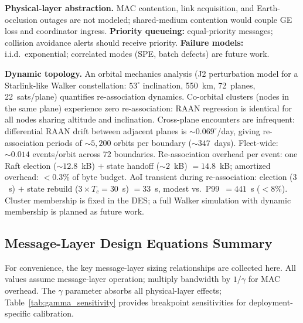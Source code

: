 \documentclass[journal]{IEEEtran}
\begin{document}
\textbf{Physical-layer abstraction.} MAC contention, link acquisition, and Earth-occlusion outages are not modeled; shared-medium contention would couple GE loss and coordinator ingress. \textbf{Priority queueing:} equal-priority messages; collision avoidance alerts should receive priority. \textbf{Failure models:} i.i.d.\ exponential; correlated modes (SPE, batch defects) are future work.

\textbf{Dynamic topology.} An orbital mechanics analysis (J2 perturbation model for a Starlink-like Walker constellation: $53^\circ$ inclination, 550~km, 72~planes, 22~sats/plane) quantifies re-association dynamics. Co-orbital clusters (nodes in the same plane) experience zero re-association: RAAN regression is identical for all nodes sharing altitude and inclination. Cross-plane encounters are infrequent: differential RAAN drift between adjacent planes is ${\sim}0.069^\circ$/day, giving re-association periods of ${\sim}5{,}200$ orbits per boundary (${\sim}347$~days). Fleet-wide: ${\sim}0.014$ events/orbit across 72 boundaries. Re-association overhead per event: one Raft election (${\sim}12.8$~kB) $+$ state handoff (${\sim}2$~kB) $= 14.8$~kB; amortized overhead: $<$0.3\% of byte budget. AoI transient during re-association: election ($3$~s) $+$ state rebuild ($3 \times T_c = 30$~s) $= 33$~s, modest vs.\ P99~$= 441$~s ($<$8\%). Cluster membership is fixed in the DES; a full Walker simulation with dynamic membership is planned as future work.


\subsection{Message-Layer Design Equations Summary}

For convenience, the key message-layer sizing relationships are collected here. All values assume message-layer operation; multiply bandwidth by $1/\gamma$ for MAC overhead. The $\gamma$ parameter absorbs all physical-layer effects; Table~\ref{tab:gamma_sensitivity} provides breakpoint sensitivities for deployment-specific calibration.
\end{document}
